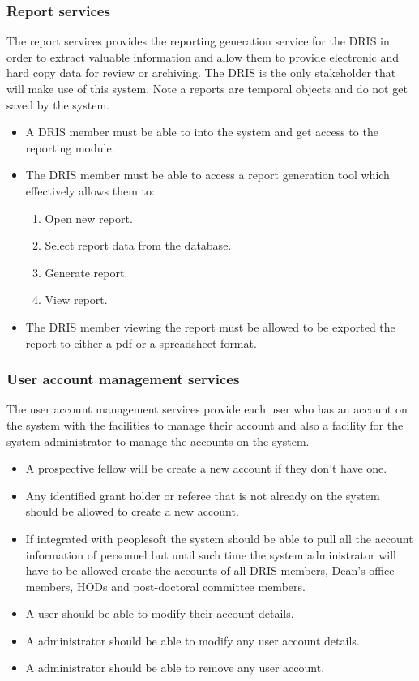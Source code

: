 \documentclass[12pt]{article}
\begin{document}
\subsubsection{Report services}
The report services provides the reporting generation service for the DRIS in order to extract valuable information and allow them to provide electronic and hard copy data for review or archiving. The DRIS is the only stakeholder that will make use of this system. Note a reports are temporal objects and do not get saved by the system.
\begin{itemize}
	\item A DRIS member must be able to into the system and get access to the reporting module.
	\item The DRIS member must be able to access a report generation tool which effectively allows them to:
	\begin{enumerate}
		\item Open new report.
		\item Select report data from the database.
		\item Generate report.
		\item View report.
	\end{enumerate}
	\item The DRIS member viewing the report must be allowed to be exported the report to either a pdf or a spreadsheet format.	
\end{itemize}

\subsubsection{User account management services} %
The user account management services provide each user who has an account on the system with the facilities to manage their account and also a facility for the system administrator to manage the accounts on the system.
\begin{itemize}
	\item A prospective fellow will be create a new account if they don't have one.
	\item Any identified grant holder or referee that is not already on the system should be allowed to create a new account.
	\item If integrated with peoplesoft the system should be able to pull all the account information of personnel but until such time the system administrator will have to be allowed create the accounts of all DRIS members, Dean's office members, HODs and post-doctoral committee members.	
	\item A user should be able to modify their account details.
	\item A administrator should be able to modify any user account details.
	\item A administrator should be able to remove any user account.
\end{itemize}
\end{document}
